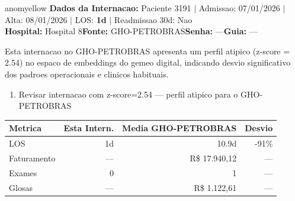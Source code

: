 \documentclass[a4paper,10pt]{article}
\begin{document}
\begin{anomalycard}[Internacao 160888 | GHO-PETROBRAS | MODERADO (z=2.54)]{anomyellow}
\textbf{Dados da Internacao:} Paciente 3191 $\mid$ Admissao: 07/01/2026 $\mid$ Alta: 08/01/2026 $\mid$ LOS: \textbf{1d} $\mid$ Readmissao 30d: Nao\\
\textbf{Hospital:} Hospital 8\quad\textbf{Fonte:} GHO-PETROBRAS\quad\textbf{Senha:} ---\quad\textbf{Guia:} ---\\
\vspace{2pt}\begin{tcolorbox}[colback=severityred!20,colframe=anomyellow,title={\textbf{Interpretacao de Negocio}},fonttitle=\bfseries\small,left=4pt,right=4pt,top=3pt,bottom=3pt]
{\small Esta internacao no GHO-PETROBRAS apresenta um perfil atipico (z-score = 2.54) no espaco de embeddings do gemeo digital, indicando desvio significativo dos padroes operacionais e clinicos habituais.}
\end{tcolorbox}
\begin{tcolorbox}[colback=severityyellow!30,colframe=anomorange,title={\textbf{Recomendacoes Especificas}},fonttitle=\bfseries\small,left=4pt,right=4pt,top=3pt,bottom=3pt]
\begin{enumerate}[nosep,leftmargin=16pt]
\item {\small Revisar internacao com z-score=2.54 --- perfil atipico para o GHO-PETROBRAS}
\end{enumerate}
\end{tcolorbox}
\begin{center}\begin{tabular}{l r r r}\toprule\textbf{Metrica} & \textbf{Esta Intern.} & \textbf{Media GHO-PETROBRAS} & \textbf{Desvio} \\\midrule
LOS & 1d & 10.9d & -91\% \\
Faturamento & --- & R\$ 17.940,12 & --- \\
Exames & 0 & 1 & --- \\
Glosas & --- & R\$ 1.122,61 & --- \\
\bottomrule\end{tabular}\end{center}


\end{anomalycard}
\end{document}
